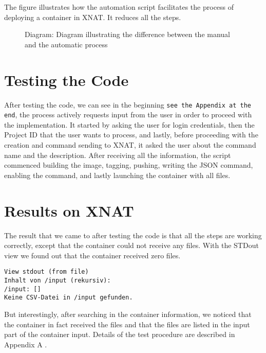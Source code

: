 The figure illustrates how the automation script facilitates the process of deploying a container in XNAT. It reduces all the steps.

\begin{figure}[ht]
    \centering
    \def\svgwidth{0.9\linewidth}
    
    \caption{Diagram: Diagram illustrating the difference between the manual and the automatic process}
    \label{fig:enter-label}
\end{figure}

\begin{comment}
    https://wiki.xnat.org/documentation/strategies-for-xnat-image-data-storage
\end{comment}


\section{Testing the Code}
After testing the code, we can see in the beginning \texttt{see the Appendix at the end}, the process actively requests input from the user in order to proceed with the implementation. It started by asking the user for login credentials, then the Project ID that the user wants to process, and lastly, before proceeding with the creation and command sending to XNAT, it asked the user about the command name and the description.
After receiving all the information, the script commenced building the image, tagging, pushing, writing the JSON command, enabling the command, and lastly launching the container with all files.

\section{Results on XNAT}
The result that we came to after testing the code is that all the steps are working correctly, except that the container could not receive any files. With the \ac{STDout} view we found out that the container received zero files. 
 
\begin{lstlisting}[numbers=none]
View stdout (from file)
Inhalt von /input (rekursiv):
/input: []
Keine CSV-Datei in /input gefunden.
\end{lstlisting}


But interestingly, after searching in the container information, we noticed that the container in fact received the files and that the files are listed in the input part of the container input. 
Details of the test procedure are described in Appendix A \cite{bousfiha2025appendix}.

